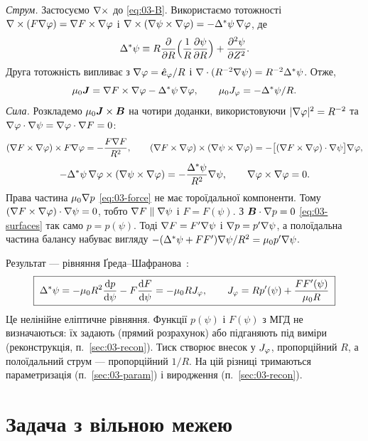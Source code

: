\begin{derivation}
\emph{Струм.} Застосуємо $\nabla\times$ до \eqref{eq:03-B}. Використаємо тотожності $\nabla\times(F\nabla\varphi)=\nabla F\times\nabla\varphi$ і $\nabla\times(\nabla\psi\times\nabla\varphi)=-\Delta^{*}\psi\,\nabla\varphi$, де
\begin{equation}\label{eq:03-GSop}
\Delta^{*}\psi\equiv R\frac{\partial}{\partial R}\Big(\frac1R\frac{\partial\psi}{\partial R}\Big)+\frac{\partial^2\psi}{\partial Z^2}.
\end{equation}
Друга тотожність випливає з $\nabla\varphi=\hat{\bm{e}}_\varphi/R$ і $\nabla\cdot(R^{-2}\nabla\psi)=R^{-2}\Delta^{*}\psi$. Отже,
\[
\mu_0\bm{J}=\nabla F\times\nabla\varphi-\Delta^{*}\psi\,\nabla\varphi,\qquad \mu_0J_{\varphi}=-\Delta^{*}\psi/R .
\]
\emph{Сила.} Розкладемо $\mu_0\bm{J}\times\bm{B}$ на чотири доданки, використовуючи $|\nabla\varphi|^2=R^{-2}$ та $\nabla\varphi\cdot\nabla\psi=\nabla\varphi\cdot\nabla F=0$:
\[
(\nabla F\times\nabla\varphi)\times F\nabla\varphi=-\frac{F\nabla F}{R^2},\qquad
(\nabla F\times\nabla\varphi)\times(\nabla\psi\times\nabla\varphi)=-\big[(\nabla F\times\nabla\varphi)\cdot\nabla\psi\big]\nabla\varphi,
\]
\[
-\Delta^{*}\psi\,\nabla\varphi\times(\nabla\psi\times\nabla\varphi)=-\frac{\Delta^{*}\psi}{R^2}\nabla\psi,\qquad \nabla\varphi\times\nabla\varphi=0 .
\]
Права частина $\mu_0\nabla p$ \eqref{eq:03-force} не має тороїдальної компоненти. Тому $(\nabla F\times\nabla\varphi)\cdot\nabla\psi=0$, тобто $\nabla F\parallel\nabla\psi$ і $F=F(\psi)$. З $\bm{B}\cdot\nabla p=0$ \eqref{eq:03-surfaces} так само $p=p(\psi)$. Тоді $\nabla F=F'\nabla\psi$ і $\nabla p=p'\nabla\psi$, а полоїдальна частина балансу набуває вигляду $-(\Delta^{*}\psi+FF')\nabla\psi/R^2=\mu_0p'\nabla\psi$.
\end{derivation}

Результат --- рівняння Ґреда--Шафранова~\cite[с.~30, (3.1)]{Merlo2011}:
\begin{equation}\label{eq:03-GS}
\boxed{\;\Delta^{*}\psi=-\mu_0R^2\frac{\mathrm{d} p}{\mathrm{d}\psi}-F\frac{\mathrm{d} F}{\mathrm{d}\psi}=-\mu_0RJ_{\varphi},\qquad
J_{\varphi}=Rp'(\psi)+\frac{FF'(\psi)}{\mu_0R}\;}
\end{equation}
Це нелінійне еліптичне рівняння. Функції $p(\psi)$ і $F(\psi)$ з МГД не визначаються: їх задають (прямий розрахунок) або підганяють під виміри (реконструкція, п.~\ref{sec:03-recon}). Тиск створює внесок у $J_{\varphi}$, пропорційний $R$, а полоїдальний струм --- пропорційний $1/R$. На цій різниці тримаються параметризація (п.~\ref{sec:03-param}) і виродження (п.~\ref{sec:03-recon}).

\section{Задача з вільною межею}\label{sec:03-free}

